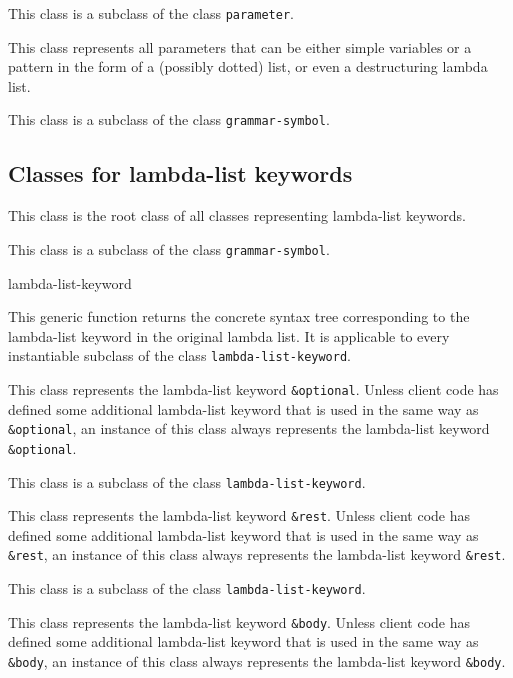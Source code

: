 This class is a subclass of the class \texttt{parameter}.


This class represents all parameters that can be either simple
variables or a pattern in the form of a (possibly dotted) list, or
even a destructuring lambda list.

This class is a subclass of the class \texttt{grammar-symbol}.

\subsection{Classes for lambda-list keywords}


This class is the root class of all classes representing lambda-list
keywords.

This class is a subclass of the class \texttt{grammar-symbol}.

 {lambda-list-keyword}

This generic function returns the concrete syntax tree corresponding
to the lambda-list keyword in the original lambda list.  It is
applicable to every instantiable subclass of the class
\texttt{lambda-list-keyword}.


This class represents the lambda-list keyword \texttt{\&optional}.
Unless client code has defined some additional lambda-list keyword
that is used in the same way as \texttt{\&optional}, an instance of
this class always represents the lambda-list keyword
\texttt{\&optional}.

This class is a subclass of the class \texttt{lambda-list-keyword}.


This class represents the lambda-list keyword \texttt{\&rest}.
Unless client code has defined some additional lambda-list keyword
that is used in the same way as \texttt{\&rest}, an instance of
this class always represents the lambda-list keyword
\texttt{\&rest}.

This class is a subclass of the class \texttt{lambda-list-keyword}.


This class represents the lambda-list keyword \texttt{\&body}.
Unless client code has defined some additional lambda-list keyword
that is used in the same way as \texttt{\&body}, an instance of
this class always represents the lambda-list keyword
\texttt{\&body}.

